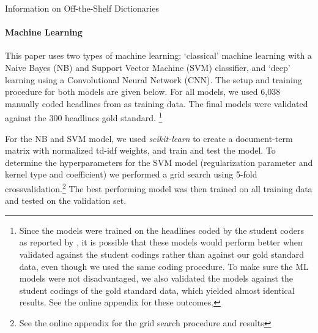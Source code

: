 \begin{table*}[h!]
  \caption{Information on Off-the-Shelf Dictionaries}\label{tab:info}

\end{table*}

\paragraph{Machine Learning} \label{ML}
This paper uses two types of machine learning: 
`classical' machine learning with a Naive Bayes (NB) and Support Vector Machine (SVM) classifier, and `deep' learning using a Convolutional Neural Network (CNN).
The setup and training procedure for both models are given below.
For all models, we used 6,038 manually coded headlines from \citet{boukes2019} as training data. 
The final models were validated against the 300 headlines gold standard.%
\footnote{
Since the models were trained on the headlines coded by the student coders as reported by \citet{boukes2019},
it is possible that these models would perform better when validated against the student codings rather than against our gold standard data, 
even though we used the same coding procedure. 
To make sure the ML models were not disadvantaged, we also validated the models against the student codings of the gold standard data,
which yielded almost identical results. See the online appendix for these outcomes. }

For the NB and SVM model, we used \emph{scikit-learn} \citep{sklearn} to create a document-term matrix with normalized td-idf weights,
and train and test the model. 
To determine the hyperparameters for the SVM model (regularization parameter and kernel type and coefficient)
we performed a grid search using 5-fold crossvalidation.\footnote{See the online appendix for the grid search procedure and results}
The best performing model was then trained on all training data and tested on the validation set. 


